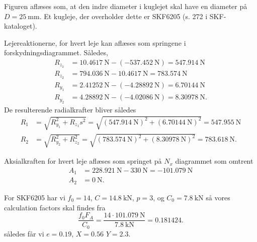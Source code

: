     \begin{derivation}
      Figuren aflæses som, at den indre diameter i kuglejet skal have en diameter på $D = \qty{25}{\mm}$.
      Et kugleje, der overholder dette er SKF6205 (s. 272 i SKF-kataloget).

      Lejereaktionerne, for hvert leje kan aflæses som springene i forskydningsdiagrammet.
      Således,
      \begin{align*}
        R_{z_1} &= \qty{10,4617}{\N} - ( - \qty{537,452}{\N} ) = \qty{547.914}{\N} \\
        R_{z_2} &= \qty{794,036}{\N} - \qty{10,4617}{\N} = \qty{783.574}{\N} \\
        R_{y_1} &= \qty{2,41252}{\N} - ( - \qty{4,28892}{\N} )  = \qty{6.70144}{\N}\\
        R_{y_2} &= \qty{4,28892}{\N} - (- \qty{4,02086}{\N} ) = \qty{8.30978}{\N}
      .\end{align*}
      De resulterende radialkrafter bliver således
      \begin{align*}
        R_{1} &= \sqrt{R_{y_1}^2 + R_{z_1}s^2} = \sqrt{\left( \qty{547,914}{\N}  \right)^2 + ( \qty{6,70144}{\N} )^2}  = \qty{547.955}{\N}\\
        R_{2} &= \sqrt{R_{y_2}^2 + R_{z_2}^2} = \sqrt{\left( \qty{783,574}{\N}  \right)^2 + (\qty{8,30978}{\N} )^2} = \qty{783.618}{\N}
      .\end{align*}

      Aksialkraften for hvert leje aflæses som springet på $N_x$ diagrammet som omtrent
      \begin{align*}
        A_1 &= \qty{228,921}{\N} - \qty{330}{\N}  = \qty{-101.079}{\N} \\
        A_2 &= \qty{0}{\N} 
      .\end{align*}

      For SKF6205 har vi $f_0 = 14$, $C = \qty{14,8}{\kN} $, $p = 3$, og $C_0 = \qty{7,8}{\kN}$ så vores calculation factors skal findes fra
      \begin{equation*}
        \frac{f_0 F_A}{C_0} = \frac{14 \cdot \qty{101,079}{\N} }{\qty{7,8}{\kN}} = 0.181424
      .\end{equation*}
      således får vi $e = \num{0,19}$, $X = \num{0,56}$ $Y = \num{2,3}$. 


\end{derivation}
